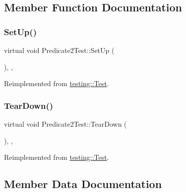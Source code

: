 \subsection{Member Function Documentation}
\mbox{\label{classPredicate2Test_a9778563daf4846327d32061c1a8ccba0}} 
\subsubsection{\texorpdfstring{SetUp()}{SetUp()}}
{\footnotesize\ttfamily virtual void Predicate2\+Test\+::\+Set\+Up (\begin{DoxyParamCaption}{ }\end{DoxyParamCaption})\hspace{0.3cm}{\ttfamily [inline]}, {\ttfamily [protected]}, {\ttfamily [virtual]}}



Reimplemented from \mbox{\hyperlink{classtesting_1_1Test_a190315150c303ddf801313fd1a777733}{testing\+::\+Test}}.

\mbox{\label{classPredicate2Test_a7379f8f7772af6b4c76edcc90b6aaaeb}} 
\subsubsection{\texorpdfstring{TearDown()}{TearDown()}}
{\footnotesize\ttfamily virtual void Predicate2\+Test\+::\+Tear\+Down (\begin{DoxyParamCaption}{ }\end{DoxyParamCaption})\hspace{0.3cm}{\ttfamily [inline]}, {\ttfamily [protected]}, {\ttfamily [virtual]}}



Reimplemented from \mbox{\hyperlink{classtesting_1_1Test_a5f0ab439802cbe0ef7552f1a9f791923}{testing\+::\+Test}}.



\subsection{Member Data Documentation}
\mbox{\label{classPredicate2Test_a56cf1f0f556addd9a62e0644dc1a86fc}} 
